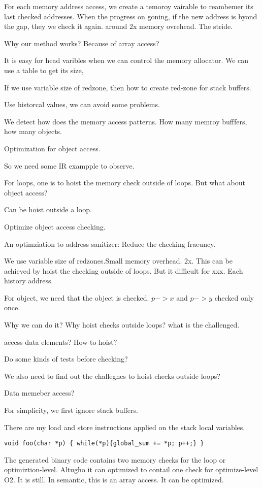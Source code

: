 For each memory address access, we create a temoroy vairable to reambemer its last checked addresses.
When the progress on goning, if the new address is byond the gap, they we check it again.
around 2x memory ovrehead. The stride.

Why our method works? Because of array access?

It is easy for head varibles when we can control the memory allocator.
We can use a table to get its size,

If we use variable size of redzone, then how to create red-zone for stack buffers.

Use historcal values, we can avoid some problems.

We detect how does the memory access patterns.
How many memroy bufffers, how many objects.

Optimization for object access.

So we need some IR exampple to observe.


For loops, one is to hoist the memory check outside of loops.
But what about object access?

Can be hoist outside a loop.

Optimize object access checking.

An optimziation to address sanitizer:
Reduce the  checking fraeuncy.


We use variable size of redzones.Small memory overhead. 2x.
This can be achieved by hoist the checking outside of loops. But it difficult for xxx.
Each history address.

For object, we need that the object is checked.
$p->x$ and $p->y$ checked only once.

Why we can do it?
Why hoist checks outside loops? what is the challenged.

access data elements? How to hoist?

Do some kinds of tests before checking?

We also need to find out the challegnes to hoist checks outside loops?


Data memeber access?

For simplicity, we first ignore stack buffers.

There are my load and store instructions applied on the stack local variables.


\begin{verbatim}
void foo(char *p) { while(*p){global_sum += *p; p++;} }
\end{verbatim}
The generated binary code contains two memory checks for the loop or optimiztion-level.
Altugho it can optimized to contail one check for optimize-level O2.
It is still.
In semantic, this is an array access. It can be optimized.




